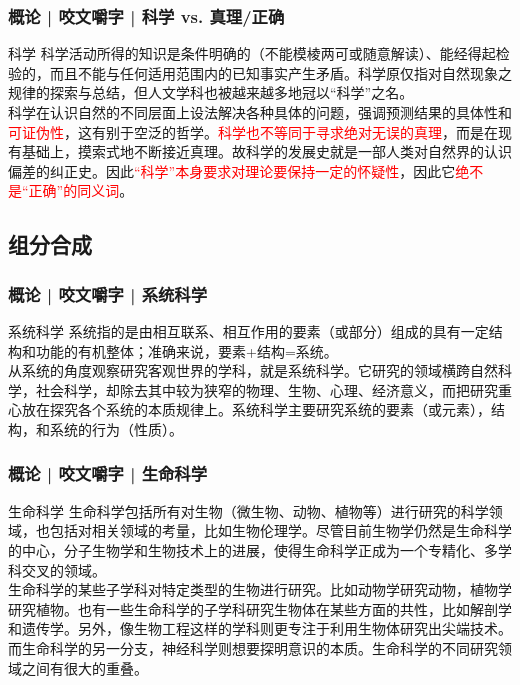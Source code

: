\begin{frame}
  \frametitle{概论 | 咬文嚼字 | 科学 vs. 真理/正确}
  \begin{block}{科学}
科学活动所得的知识是条件明确的（不能模棱两可或随意解读）、能经得起检验的，而且不能与任何适用范围内的已知事实产生矛盾。科学原仅指对自然现象之规律的探索与总结，但人文学科也被越来越多地冠以“科学”之名。\\
    \vspace{1em}
科学在认识自然的不同层面上设法解决各种具体的问题，强调预测结果的具体性和\textcolor{red}{可证伪性}，这有别于空泛的哲学。\textcolor{red}{科学也不等同于寻求绝对无误的真理}，而是在现有基础上，摸索式地不断接近真理。故科学的发展史就是一部人类对自然界的认识偏差的纠正史。因此\textcolor{red}{“科学”本身要求对理论要保持一定的怀疑性}，因此它\textcolor{red}{绝不是“正确”的同义词}。
  \end{block}
\end{frame}

\subsection{组分合成}
\begin{frame}
  \frametitle{概论 | 咬文嚼字 | 系统科学}
  \begin{block}{系统科学}
系统指的是由相互联系、相互作用的要素（或部分）组成的具有一定结构和功能的有机整体；准确来说，要素+结构=系统。\\
\vspace{1em}
从系统的角度观察研究客观世界的学科，就是系统科学。它研究的领域横跨自然科学，社会科学，却除去其中较为狭窄的物理、生物、心理、经济意义，而把研究重心放在探究各个系统的本质规律上。系统科学主要研究系统的要素（或元素），结构，和系统的行为（性质）。 
  \end{block}
\end{frame}

\begin{frame}
  \frametitle{概论 | 咬文嚼字 | 生命科学}
  \begin{block}{生命科学}
生命科学包括所有对生物（微生物、动物、植物等）进行研究的科学领域，也包括对相关领域的考量，比如生物伦理学。尽管目前生物学仍然是生命科学的中心，分子生物学和生物技术上的进展，使得生命科学正成为一个专精化、多学科交叉的领域。\\
    \vspace{1em}
生命科学的某些子学科对特定类型的生物进行研究。比如动物学研究动物，植物学研究植物。也有一些生命科学的子学科研究生物体在某些方面的共性，比如解剖学和遗传学。另外，像生物工程这样的学科则更专注于利用生物体研究出尖端技术。而生命科学的另一分支，神经科学则想要探明意识的本质。生命科学的不同研究领域之间有很大的重叠。\\
  \end{block}
\end{frame}

